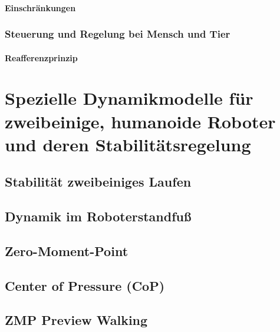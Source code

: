 \documentclass[a4paper, 11pt, accentcolor = tud3b]{tudreport}
\begin{document}
					\paragraph{Einschränkungen} %

				\subsubsection{Steuerung und Regelung bei Mensch und Tier} %

					\paragraph{Reafferenzprinzip} %

		\section{Spezielle Dynamikmodelle für zweibeinige, humanoide Roboter und deren Stabilitätsregelung} %

			\subsection{Stabilität zweibeiniges Laufen} %

			\subsection{Dynamik im Roboterstandfuß} %

			\subsection{Zero-Moment-Point} %

			\subsection{Center of Pressure (CoP)} %

			\subsection{ZMP Preview Walking} %
\end{document}
